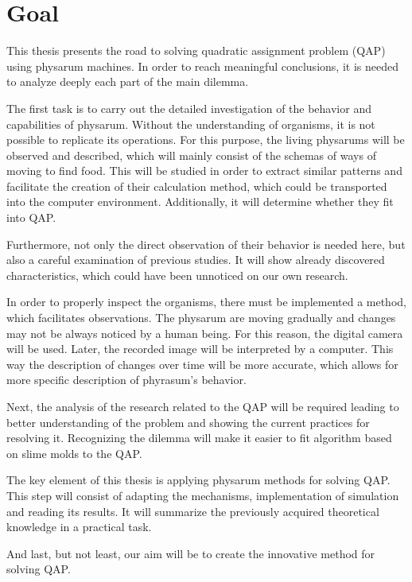 \section{Goal}
\label{section:introduction_goal}

This thesis presents the road to solving quadratic assignment problem (QAP) using physarum machines. In order to reach meaningful conclusions, it is needed to analyze deeply each part of the main dilemma.

The first task is to carry out the detailed investigation of the behavior and capabilities of physarum. Without the understanding of organisms, it is not possible to replicate its operations. For this purpose, the living physarums will be observed and described, which will mainly consist of the schemas of ways of moving to find food. This will be studied in order to extract similar patterns and facilitate the creation of their calculation method, which could be transported into the computer environment. Additionally, it will determine whether they fit into QAP.

Furthermore, not only the direct observation of their behavior is needed here, but also a careful examination of previous studies. It will show already discovered characteristics, which could have been unnoticed on our own research.

In order to properly inspect the organisms, there must be implemented a method, which facilitates observations. The physarum are moving gradually and changes may not be always noticed by a human being. For this reason, the digital camera will be used. Later, the recorded image will be interpreted by a computer. This way the description of changes over time will be more accurate, which allows for more specific description of phyrasum's behavior.

Next, the analysis of the research related to the QAP will be required leading to better understanding of the problem and showing the current practices for resolving it. Recognizing the dilemma will make it easier to fit algorithm based on slime molds to the QAP.

The key element of this thesis is applying physarum methods for solving QAP. This step will consist of adapting the mechanisms, implementation of simulation and reading its results. It will summarize the previously acquired theoretical knowledge in a practical task.

And last, but not least, our aim will be to create the innovative method for solving QAP.
